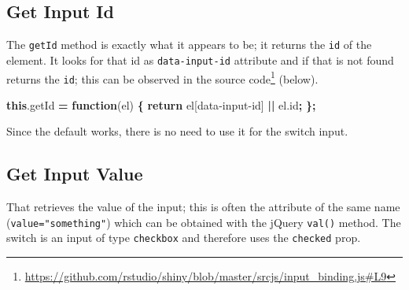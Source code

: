 \documentclass[
  10pt,
]{krantz}
\makeatletter
\newenvironment{Shaded}{\begin{snugshade}}{\end{snugshade}}
\newcommand{\AttributeTok}[1]{\textcolor[rgb]{0.61,0.61,0.61}{#1}}
\newcommand{\CommentTok}[1]{\textcolor[rgb]{0.37,0.37,0.37}{\textit{#1}}}
\newcommand{\ControlFlowTok}[1]{\textcolor[rgb]{0.27,0.27,0.27}{\textbf{#1}}}
\newcommand{\DataTypeTok}[1]{\textcolor[rgb]{0.27,0.27,0.27}{#1}}
\newcommand{\KeywordTok}[1]{\textcolor[rgb]{0.27,0.27,0.27}{\textbf{#1}}}
\newcommand{\NormalTok}[1]{#1}
\newcommand{\OperatorTok}[1]{\textcolor[rgb]{0.43,0.43,0.43}{\textbf{#1}}}
\newcommand{\StringTok}[1]{\textcolor[rgb]{0.5,0.5,0.5}{#1}}
\newcommand{\VariableTok}[1]{\textcolor[rgb]{0,0,0}{#1}}
\renewcommand{\href}[2]{#2\footnote{\url{#1}}}
\newenvironment{kframe}{%
\medskip{}
\setlength{\fboxsep}{.8em}
 \def\at@end@of@kframe{}%
 \ifinner\ifhmode%
  \def\at@end@of@kframe{\end{minipage}}%
  \begin{minipage}{\columnwidth}%
 \fi\fi%
 \def\FrameCommand##1{\hskip\@totalleftmargin \hskip-\fboxsep
 \colorbox{shadecolor}{##1}\hskip-\fboxsep
     \hskip-\linewidth \hskip-\@totalleftmargin \hskip\columnwidth}%
 \MakeFramed {\advance\hsize-\width
   \@totalleftmargin\z@ \linewidth\hsize
   \@setminipage}}%
 {\par\unskip\endMakeFramed%
 \at@end@of@kframe}
\renewenvironment{Shaded}{\begin{kframe}}{\end{kframe}}
\makeatother
\begin{document}
\hypertarget{shiny-input-get-id}{%
\subsection{Get Input Id}\label{shiny-input-get-id}}

The \texttt{getId} method is exactly what it appears to be; it returns the \texttt{id} of the element. It looks for that id as \texttt{data-input-id} attribute and if that is not found returns the \texttt{id}; this can be observed in the \href{https://github.com/rstudio/shiny/blob/master/srcjs/input_binding.js\#L9}{source code} (below).

\begin{Shaded}
\begin{Highlighting}[]
\KeywordTok{this}\NormalTok{.}\AttributeTok{getId} \OperatorTok{=} \KeywordTok{function}\NormalTok{(el) }\OperatorTok{\{}
  \ControlFlowTok{return}\NormalTok{ el[}\StringTok{\textquotesingle{}data{-}input{-}id\textquotesingle{}}\NormalTok{] }\OperatorTok{||} \VariableTok{el}\NormalTok{.}\AttributeTok{id}\OperatorTok{;}
\OperatorTok{\};}
\end{Highlighting}
\end{Shaded}

Since the default works, there is no need to use it for the switch input.

\hypertarget{shiny-input-get-value}{%
\subsection{Get Input Value}\label{shiny-input-get-value}}

That retrieves the value of the input; this is often the attribute of the same name (\texttt{value="something"}) which can be obtained with the jQuery \texttt{val()} method. The switch is an input of type \texttt{checkbox} and therefore uses the \texttt{checked} prop.

\begin{Shaded}
\end{Shaded}
\end{document}
